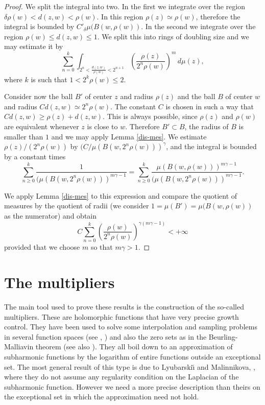 \documentclass[12pt,twoside,final,psamsfonts]{amsart}
\theoremstyle{plain}
\theoremstyle{remark}
\theoremstyle{definition}
\begin{document}
\begin{proof}
We split the integral into two. In the first we integrate over the region
$\delta\rho(w)<\allowbreak d(z,w)<\rho(w)$. In this region $\rho(z)\simeq\rho(w)$,
therefore the integral is bounded by  
$C'_\delta\mu(B(w,\rho(w))$. In the second we integrate over the
region $\rho(w)\le d(z,w)\le 1$. 
We split this into rings of doubling size and we
may estimate it by
\[
\sum_{n=0}^k \int_{2^n<\frac{d(z,w)}{\rho(w)}<2^{n+1}}  \left(\frac{\rho(z)}
{2^n\rho(w)}\right)^m\, d\mu(z),
\]
where $k$ is such that $1<2^{k}\rho(w)\le 2$. 

Consider now the ball $B'$ of center $z$ and radius $\rho(z)$ and the ball $B$
of center $w$ and radius $C d(z,w)\simeq 2^n\rho(w)$. The constant $C$ is 
chosen
in such a way that $Cd(z,w)\ge \rho(z)+d(z,w)$. This is always possible,
since $\rho(z)$ and $\rho(w)$ are equivalent whenever $z$ is close to $w$.  
Therefore $B'\subset B$,
the radius of $B$ is smaller than $1$ and  we
may apply Lemma \ref{dis-mes}. We estimate $\rho(z)/(2^n\rho(w))$ by
$(C/\mu(B(w,2^n\rho(w)))^\gamma$, and the integral is bounded by a
constant times
\[
\sum_{n\ge 0}^k \frac{1}{(\mu(B(w,2^n\rho(w)))^{m\gamma-1}}=
\sum_{n\ge 0}^k \frac{\mu(B(w,\rho(w)))^{m\gamma -1}}
{(\mu(B(w,2^n\rho(w)))^{m\gamma-1}}.
\]

We apply Lemma \ref{dis-mes} to this expression and compare 
the quotient of measures by the quotient of radii (we consider
$1=\mu(B')=\mu(B(w,\rho(w))$ as the numerator) and obtain
\[
C\sum_{n=0}^k
\left(\frac{\rho(w)}{2^n\rho(w)}\right)^{\gamma(m\gamma-1)}<+\infty
\]
provided that we choose $m$ so that $m\gamma>1$.
\end{proof}

\section{The multipliers}\label{multiplier}
The main tool used to prove these results is the construction of the so-called
multipliers. These are holomorphic functions that have very precise growth
control. They have been used to solve some interpolation and sampling 
problems in several function spaces (see \cite{OrtSei98}, \cite{LyuSei94}) and
also the zero sets as in the Beurling-Malliavin theorem  (see also
\cite{Seip95b}). They all boil down to an approximation of subharmonic
functions by the logarithm of entire functions outside an exceptional set. 
The most general result of this
type is due to Lyubarski{\u\i} and Malinnikova, \cite{LyuMal99}, 
where they do not assume any
regularity condition on the Laplacian of the subharmonic function. However
we need a more precise description than theirs on 
the exceptional set in which the approximation need not hold.
\end{document}
